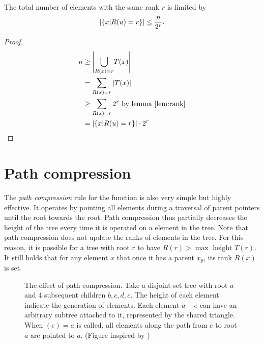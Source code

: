 \begin{lemma}\label{lem:noderank}
  The total number of elements with the same rank $r$ is limited by 
  \begin{equation}
      \abs{\{x | R(u)=r \}} \leq \frac{n}{2^r}.
  \end{equation}
\end{lemma}
\begin{proof}
    \begin{align*}
        n &\geq \Bigg| \underset{R(x)=r}{\bigcup} T(x) \Bigg| \\
        &= \sum_{R(x)=r} \abs{T(x)} \\
        &\geq \sum_{R(x)=r} 2^r \text{ by lemma \ref{lem:rank}}\\
        &= \abs{\{x | R(u)=r\}}\cdot 2^r
    \end{align*}
\end{proof}

\section{Path compression}
The \emph{path compression} rule for the  function is also very simple but highly effective. It operates by pointing all elements during a traversal of parent pointers until the root towards the root. Path compression thus partially decreases the height of the tree every time it is operated on a element in the tree. Note that path compression does not update the ranks of elements in the tree. For this reason, it is possible for a tree with root $r$ to have $R(r) > \max \text{ height } T(r)$. It still holds that for any element $x$ that once it has a parent $x_p$, its rank $R(x)$ is set. 

\newcommand\DRAWTREE[3]{
  \node[fnode] at (#1,#2) (#3) {$#3$};
  \draw[lw1, fill=white!80!black] (#3.south) -- +(0.3,-1) -- +(-0.3,-1) -- cycle;
}
\begin{figure}[htpb]
  \centering
  \caption{The effect of path compression. Take a disjoint-set tree with root $a$ and 4 subsequent children $b,c,d,e$. The height of each element indicate the generation of elements. Each element $a-e$ can have an arbitrary subtree attached to it, represented by the shared triangle. When $(e)=a$ is called, all elements along the path from $e$ to root $a$ are pointed to $a$. (Figure inspired by \cite{tarjan1975efficiency})}
  \label{fig:pathcompression}
\end{figure}

